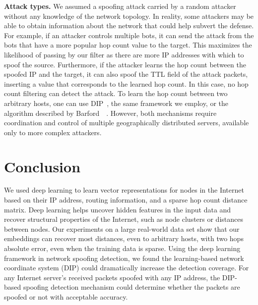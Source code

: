 {\bf Attack types.}
We assumed a spoofing attack carried by a random attacker without any knowledge of the network topology. In reality, some attackers may be able to obtain information about the network that could help subvert the defense. For example, if an attacker controls multiple bots, it can send the attack from the bots that have a more popular hop count value to the target. This maximizes the likelihood of passing by our filter as there are more IP addresses with which to spoof the source.
%
Furthermore, if the attacker learns the hop count between the spoofed IP and the target, it can also spoof the TTL field of the attack packets, inserting a value that corresponds to the learned hop count. In this case, no hop count filtering can detect the attack. To learn the hop count between two arbitrary hosts, one can use DIP~\citep{dip}, the same framework we employ, or the algorithm described by Barford~\etal{}~\citep{barford-infocom}. However, both mechanisms require coordination and control of multiple geographically distributed servers, available only to more complex attackers.



\section{Conclusion}
\label{dip:conclusions}

We used deep learning to learn vector representations for nodes in the Internet based on their IP address, routing information, and a sparse hop count distance matrix. Deep learning helps uncover hidden features in the input data and recover structural properties of the Internet, such as node clusters or distances between nodes. Our experiments on a large real-world data set show that our embeddings can recover most distances, even to arbitrary hosts, with two hops absolute error, even when the training data is sparse. 
Using the deep learning framework in network spoofing detection, we found the learning-based network coordinate system (DIP) could dramatically increase the detection coverage. For any Internet server's received packets spoofed with any IP address, the DIP-based spoofing detection mechanism could determine whether the packets are spoofed or not with acceptable accuracy.  




